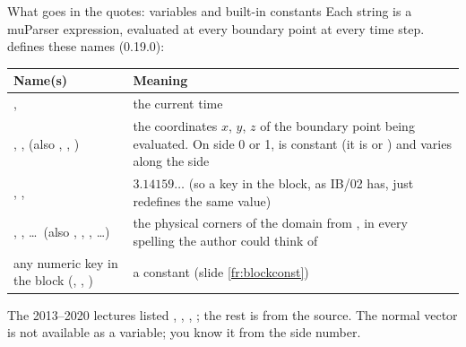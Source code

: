 \documentclass[aspectratio=169,11pt]{beamer}
\begin{document}
\begin{frame}{What goes in the quotes: variables and built-in constants}
\label{fr:vars}
\small Each string is a muParser expression, evaluated at every boundary point at every time step.  defines these names (0.19.0):
\vspace{1mm}

\scriptsize
\begin{tabular}{@{}L{0.3\textwidth}L{0.6\textwidth}@{}}
\toprule
Name(s) & Meaning\\
\midrule
{},  & the current time\\
, ,  (also , , ) & the coordinates $x$, $y$, $z$ of the boundary point being evaluated. On side 0 or 1,  is constant (it is  or ) and  varies along the side\\
, ,  & $3.14159\ldots$ (so a  key in the block, as IB/02 has, just redefines the same value)\\
, , \ldots\ (also , , , \ldots) & the physical corners of the domain from , in every spelling the author could think of\\
any numeric key in the block (, , ) & a constant (slide \ref{fr:blockconst})\\
\bottomrule
\end{tabular}

\vspace{2mm}

\small The 2013--2020 lectures listed , , , ; the rest is from the source. The normal vector is not available as a variable; you know it from the side number.
\end{frame}
\end{document}
